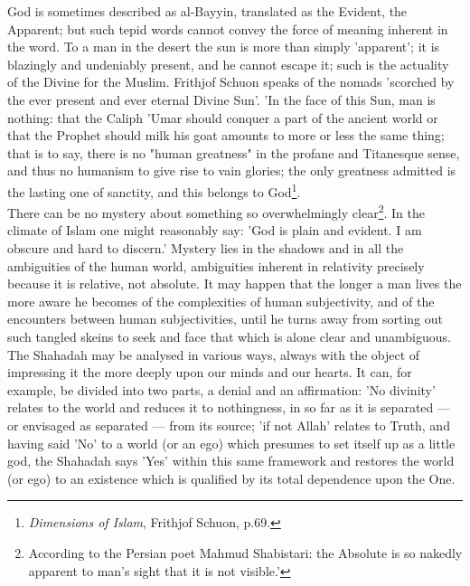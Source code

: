 \documentclass[11pt, b5paper, twoside]{book}
\begin{document}
God is sometimes described as al-Bayyin, translated as the Evident, the Apparent; but such tepid 
words cannot convey the force of meaning inherent in the word. To a man in the desert the sun is more 
than simply 'apparent'; it is blazingly and undeniably present, and he cannot escape it; such is the 
actuality of the Divine for the Muslim. Frithjof Schuon speaks of the nomads 'scorched by the ever 
present and ever eternal Divine Sun'. 'In the face of this Sun, man is nothing: that the Caliph 'Umar 
should conquer a part of the ancient world or that the Prophet should milk his goat amounts to more 
or less the same thing; that is to say, there is no "human greatness" in the profane and Titanesque 
sense, and thus no humanism to give rise to vain glories; the only greatness admitted is the lasting 
one of sanctity, and this belongs to God\footnote{\emph{Dimensions of Islam}, Frithjof Schuon, p.69.}. \\

There can be no mystery about something so overwhelmingly clear\footnote{According to the Persian poet Mahmud Shabistari: the Absolute is so nakedly apparent to man's sight that it is not visible.'}. In the climate of Islam one might reasonably say: 'God is plain and evident. I am obscure and hard to discern.' Mystery lies in the shadows and in all the ambiguities of the human world, ambiguities inherent in relativity precisely because it is relative, not absolute. It may happen that the longer a man lives the more aware he 
becomes of the complexities of human subjectivity, and of the encounters between human 
subjectivities, until he turns away from sorting out such tangled skeins to seek and face that which 
is alone clear and unambiguous. \\

The Shahadah may be analysed in various ways, always with the object of impressing it the more deeply 
upon our minds and our hearts. It can, for example, be divided into two parts, a denial and an 
affirmation: 'No divinity' relates to the world and reduces it to nothingness, in so far as it is 
separated --- or envisaged as separated --- from its source; 'if not Allah' relates to Truth, and having 
said 'No' to a world (or an ego) which presumes to set itself up as a little god, the Shahadah says 
'Yes' within this same framework and restores the world (or ego) to an existence which is qualified 
by its total dependence upon the One. \\
\end{document}
